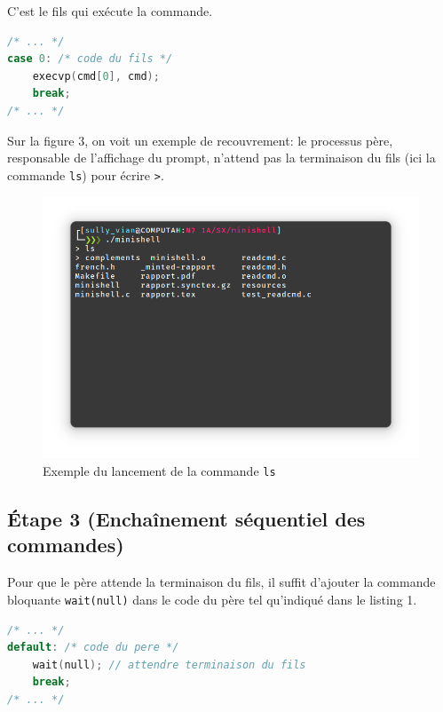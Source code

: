 \documentclass{article}
\begin{document}
C'est le fils qui exécute la commande.

\begin{lstlisting}[language=C, caption=Code de la question 2]
/* ... */
case 0: /* code du fils */
    execvp(cmd[0], cmd);
    break;
/* ... */
\end{lstlisting}

Sur la figure 3, on voit un exemple de recouvrement: le processus père, responsable de l'affichage du prompt, n'attend pas la terminaison du fils (ici la commande \texttt{ls}) pour écrire \texttt{>}.

\begin{figure}[H]
    \centering
    \includegraphics[width=1\textwidth]{./resources/E2.png}
    \caption{Exemple du lancement de la commande \texttt{ls}}
\end{figure}

\subsection*{Étape 3 (Enchaînement séquentiel des commandes)}

Pour que le père attende la terminaison du fils, il suffit d'ajouter la commande bloquante \texttt{wait(null)} dans le code du père tel qu'indiqué dans le listing 1.

\begin{lstlisting}[language=C, caption=Ajout pour la question 3]
/* ... */
default: /* code du pere */
    wait(null); // attendre terminaison du fils
    break;
/* ... */
\end{lstlisting}
\end{document}
